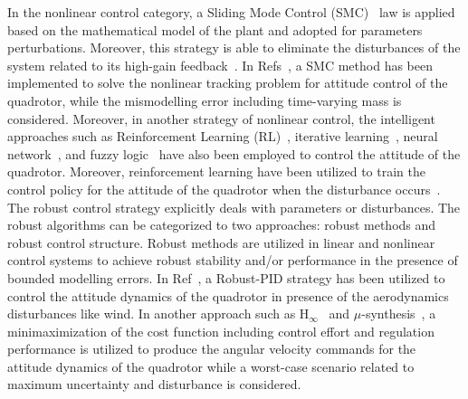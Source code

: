 \documentclass[3p]{elsarticle}
\begin{document}
In the nonlinear control category, a Sliding Mode Control (SMC)~\cite{LABBADI2020290, MOFID2022455} law is applied based on the mathematical model of the plant and adopted for parameters perturbations. Moreover, this strategy is able to eliminate the disturbances of the system related to its high-gain feedback~\cite{YANG2021175}. In Refs~\cite{WU2022436}, a SMC method has been implemented to solve the nonlinear tracking problem for attitude control of the quadrotor, while the mismodelling error including time-varying mass is considered. Moreover, in another strategy of nonlinear control, the intelligent approaches such as Reinforcement Learning (RL)~\cite{Hwangbo_2017, LIN2020135}, iterative learning~\cite{electronics10202474}, neural network~\cite{JIN202012241}, and fuzzy logic~\cite{GLIDA2022} have also been employed to control the attitude of the quadrotor. Moreover, reinforcement learning have been utilized to train the control policy for the attitude of the quadrotor when the disturbance occurs~\cite{WANG2023222}.
The robust control strategy explicitly deals with parameters or disturbances. The robust algorithms can be categorized to two approaches: robust methods and robust control structure. Robust methods are utilized in linear and nonlinear control systems to achieve robust stability and/or performance in the presence of bounded modelling errors. In Ref~\cite{MIRANDACOLORADO202047}, a Robust-PID strategy has been utilized to control the attitude dynamics of the quadrotor in presence of the aerodynamics disturbances like wind. In another approach such as H$_{\infty}$~\cite{WANG201910, REKABI202081} and $\mu$-synthesis~\cite{RODRIGUEZMARTINEZ2023739}, a minimaximization of the cost function including control effort and regulation performance is utilized to produce the angular velocity commands for the attitude dynamics of the quadrotor while a worst-case scenario related to maximum uncertainty and disturbance is considered. 
\end{document}
